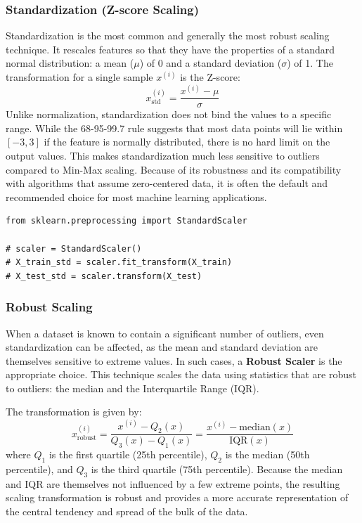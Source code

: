 \begin{itemize}
\subsubsection{Standardization (Z-score Scaling)}
Standardization is the most common and generally the most robust scaling technique. It rescales features so that they have the properties of a standard normal distribution: a mean ($\mu$) of 0 and a standard deviation ($\sigma$) of 1. The transformation for a single sample $x^{(i)}$ is the Z-score:
$$ x_{\text{std}}^{(i)} = \frac{x^{(i)} - \mu}{\sigma} $$
Unlike normalization, standardization does not bind the values to a specific range. While the 68-95-99.7 rule suggests that most data points will lie within $[-3, 3]$ if the feature is normally distributed, there is no hard limit on the output values. This makes standardization much less sensitive to outliers compared to Min-Max scaling. Because of its robustness and its compatibility with algorithms that assume zero-centered data, it is often the default and recommended choice for most machine learning applications.

\begin{verbatim}
from sklearn.preprocessing import StandardScaler

# scaler = StandardScaler()
# X_train_std = scaler.fit_transform(X_train)
# X_test_std = scaler.transform(X_test)
\end{verbatim}

\subsubsection{Robust Scaling}
When a dataset is known to contain a significant number of outliers, even standardization can be affected, as the mean and standard deviation are themselves sensitive to extreme values. In such cases, a \textbf{Robust Scaler} is the appropriate choice. This technique scales the data using statistics that are robust to outliers: the median and the Interquartile Range (IQR).

The transformation is given by:
$$ x_{\text{robust}}^{(i)} = \frac{x^{(i)} - Q_2(x)}{Q_3(x) - Q_1(x)} = \frac{x^{(i)} - \text{median}(x)}{\text{IQR}(x)} $$
where $Q_1$ is the first quartile (25th percentile), $Q_2$ is the median (50th percentile), and $Q_3$ is the third quartile (75th percentile). Because the median and IQR are themselves not influenced by a few extreme points, the resulting scaling transformation is robust and provides a more accurate representation of the central tendency and spread of the bulk of the data.


\end{itemize}
